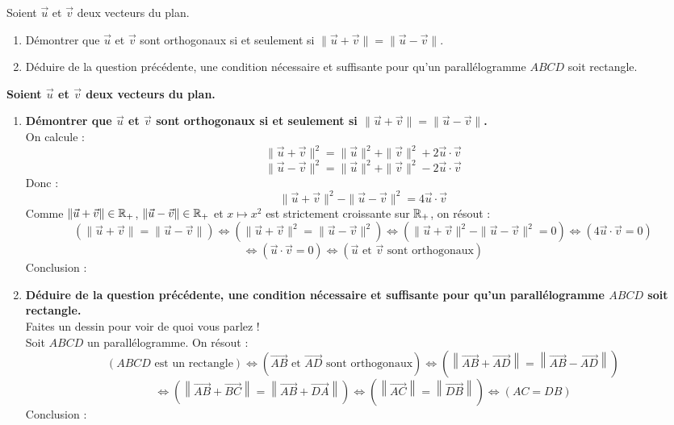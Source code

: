 \documentclass[a4paper, 11pt]{article}
\begin{document}
\begin{exercice}  \;
	Soient $\vec{u}$ et $\vec{v}$ deux vecteurs du plan.
	\begin{enumerate}
		\item D\'emontrer que $\vec{u}$ et $\vec{v}$ sont orthogonaux si et seulement si $\| \vec{u}+ \vec{v}\| = \| \vec{u}-\vec{v}\|$.
		\item D\'eduire de la question pr\'ec\'edente, une condition n\'ecessaire et suffisante pour qu'un parall\'elogramme $ABCD$ soit rectangle.
	\end{enumerate}
\end{exercice}
\begin{correction}  \;
	\textbf{Soient $\vec{u}$ et $\vec{v}$ deux vecteurs du plan.}
	\begin{enumerate}
		\item \textbf{D\'emontrer que $\vec{u}$ et $\vec{v}$ sont orthogonaux si et seulement si $\| \vec{u}+ \vec{v}\| = \| \vec{u}-\vec{v}\|$.}\\
		      On calcule :
		      $$\| \vec{u}+ \vec{v}\|^2 = \| \vec{u}\|^2 + \| \vec{v}\|^2 + 2 \vec{u} \cdot \vec{v}$$
		      $$\| \vec{u}- \vec{v}\|^2 = \| \vec{u}\|^2 + \| \vec{v}\|^2 - 2 \vec{u} \cdot \vec{v}$$
		      Donc :
		      $$\| \vec{u}+ \vec{v}\|^2 - \| \vec{u}- \vec{v}\|^2 = 4 \vec{u} \cdot \vec{v}$$
		      Comme $\| \vec{u}+ \vec{v}\| \in \mathbb{R}_+$, $\| \vec{u}- \vec{v}\| \in \mathbb{R}_+$ et $x \mapsto x^2$ est strictement croissante sur $\mathbb{R}_+$, on r\'esout :
		      $$ \left(\| \vec{u}+ \vec{v}\| = \| \vec{u}- \vec{v}\|\right) \iff \left(\| \vec{u}+ \vec{v}\|^2 = \| \vec{u}- \vec{v}\|^2\right) \iff \left(\| \vec{u}+ \vec{v}\|^2 - \| \vec{u}- \vec{v}\|^2 = 0\right) \iff \left( 4 \vec{u} \cdot \vec{v} = 0\right)$$
		      $$ \iff \left( \vec{u} \cdot \vec{v} = 0\right) \iff \left(\vec{u}\text{ et }\vec{v}\text{ sont orthogonaux}\right)$$
		      Conclusion : 
		\item \textbf{D\'eduire de la question pr\'ec\'edente, une condition n\'ecessaire et suffisante pour qu'un parall\'elogramme $ABCD$ soit rectangle.}\\
		      Faites un dessin pour voir de quoi vous parlez !\\
		      Soit $ABCD$ un parall\'elogramme. On r\'esout :
		      $$  \left(ABCD\text{ est un rectangle}\right) \iff \left( \overrightarrow{AB} \text{ et }\overrightarrow{AD} \text{ sont orthogonaux}\right) \iff \left( \left\| \overrightarrow{AB} +\overrightarrow{AD} \right\| = \left\| \overrightarrow{AB} -\overrightarrow{AD} \right\| \right)$$
		      $$ \iff \left( \left\| \overrightarrow{AB} +\overrightarrow{BC} \right\| = \left\| \overrightarrow{AB} +\overrightarrow{DA} \right\| \right) \iff \left( \left\| \overrightarrow{AC} \right\| = \left\| \overrightarrow{DB} \right\| \right) \iff \left(AC=DB\right) $$
		      Conclusion : 
	\end{enumerate}
\end{correction}
\end{document}
